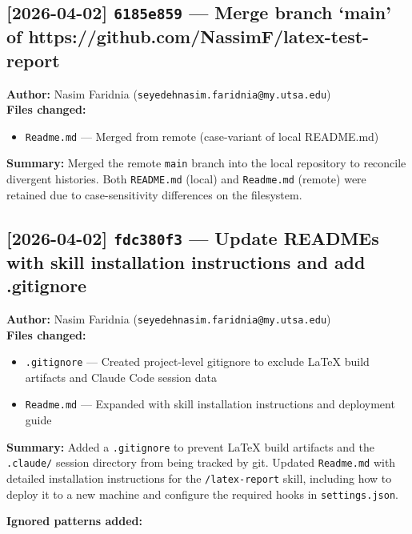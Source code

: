 \documentclass[12pt,a4paper]{article}
\begin{document}
\subsection*{[2026-04-02] \texttt{6185e859} --- Merge branch `main' of https://github.com/NassimF/latex-test-report}

\textbf{Author:} Nasim Faridnia (\texttt{seyedehnasim.faridnia@my.utsa.edu}) \\[0.3em]
\textbf{Files changed:}
\begin{itemize}
  \item \texttt{Readme.md} --- Merged from remote (case-variant of local README.md)
\end{itemize}

\vspace{0.3em}
\textbf{Summary:} Merged the remote \texttt{main} branch into the local repository to reconcile
divergent histories. Both \texttt{README.md} (local) and \texttt{Readme.md} (remote) were
retained due to case-sensitivity differences on the filesystem.

\subsection*{[2026-04-02] \texttt{fdc380f3} --- Update READMEs with skill installation instructions and add .gitignore}

\textbf{Author:} Nasim Faridnia (\texttt{seyedehnasim.faridnia@my.utsa.edu}) \\[0.3em]
\textbf{Files changed:}
\begin{itemize}
  \item \texttt{.gitignore} --- Created project-level gitignore to exclude LaTeX build artifacts and Claude Code session data
  \item \texttt{Readme.md} --- Expanded with skill installation instructions and deployment guide
\end{itemize}

\vspace{0.3em}
\textbf{Summary:} Added a \texttt{.gitignore} to prevent LaTeX build artifacts and the
\texttt{.claude/} session directory from being tracked by git. Updated \texttt{Readme.md}
with detailed installation instructions for the \texttt{/latex-report} skill, including
how to deploy it to a new machine and configure the required hooks in \texttt{settings.json}.

\vspace{0.5em}
\textbf{Ignored patterns added:}
\end{document}
